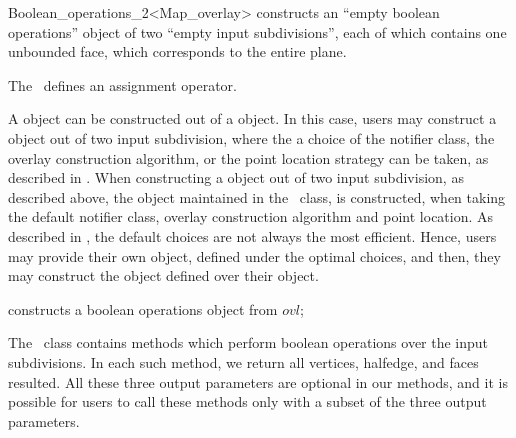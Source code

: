 \begin{ccRefClass}{Boolean_operations_2<Map_overlay>}
   {constructs an
     ``empty boolean operations'' object of two ``empty input subdivisions'', 
     each of which contains one unbounded face, which corresponds to the entire plane.}
  
  

The \ccClassTemplateName\ defines an assignment operator.


\begin{ccAdvanced}


A  object can be constructed out of a 
 object.
In this case, users may construct a  object out of two 
input subdivision, where the a choice of the notifier class, the overlay 
construction algorithm, or the point location strategy can be taken, 
as described in . 
When constructing a  object out of two input 
subdivision, as described above, the  object maintained in 
the \ccClassTemplateName\ class, is constructed, when taking the default notifier 
class, overlay construction algorithm and point location.
As described in , the default choices are not always 
the most efficient. Hence, users may provide their own 
 object, defined under the optimal choices, 
and then, they may construct the  object defined 
over their  object. 

{constructs a boolean operations object from $ovl$;}

\end{ccAdvanced}


The \ccClassTemplateName\ class contains methods which perform
boolean operations over the input subdivisions.
In each such method, we return all vertices, halfedge, and faces 
resulted. 
All these three output parameters are optional 
in our methods, and it is possible for users to call these methods 
only with a subset of the three output parameters.


\end{ccRefClass}

